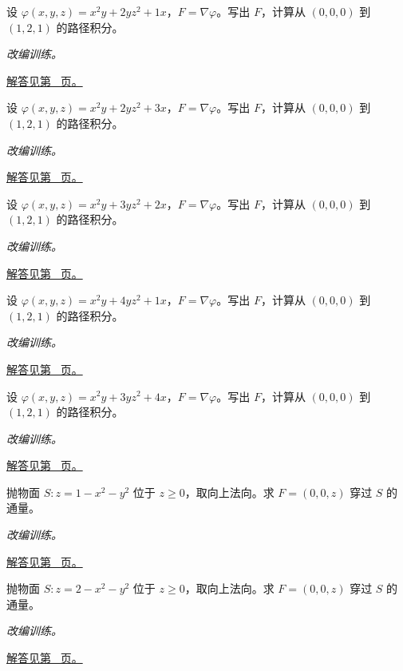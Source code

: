 \documentclass[12pt,fontset=fandol]{ctexart}
\begin{document}
\begin{example}[势函数给出的空间路径积分]\label{ex:c44q14}
设 $\varphi(x,y,z)=x^2y+2yz^2+1x$，$F=\nabla\varphi$。写出 $F$，计算从 $(0,0,0)$ 到 $(1,2,1)$ 的路径积分。
\par\textit{改编训练。}\par\hyperref[ans:c44q14]{解答见第~\pageref{ans:c44q14} 页。}
\end{example}
\begin{example}[势函数给出的空间路径积分]\label{ex:c44q15}
设 $\varphi(x,y,z)=x^2y+2yz^2+3x$，$F=\nabla\varphi$。写出 $F$，计算从 $(0,0,0)$ 到 $(1,2,1)$ 的路径积分。
\par\textit{改编训练。}\par\hyperref[ans:c44q15]{解答见第~\pageref{ans:c44q15} 页。}
\end{example}
\begin{example}[势函数给出的空间路径积分]\label{ex:c44q16}
设 $\varphi(x,y,z)=x^2y+3yz^2+2x$，$F=\nabla\varphi$。写出 $F$，计算从 $(0,0,0)$ 到 $(1,2,1)$ 的路径积分。
\par\textit{改编训练。}\par\hyperref[ans:c44q16]{解答见第~\pageref{ans:c44q16} 页。}
\end{example}
\begin{example}[势函数给出的空间路径积分]\label{ex:c44q17}
设 $\varphi(x,y,z)=x^2y+4yz^2+1x$，$F=\nabla\varphi$。写出 $F$，计算从 $(0,0,0)$ 到 $(1,2,1)$ 的路径积分。
\par\textit{改编训练。}\par\hyperref[ans:c44q17]{解答见第~\pageref{ans:c44q17} 页。}
\end{example}
\begin{example}[势函数给出的空间路径积分]\label{ex:c44q18}
设 $\varphi(x,y,z)=x^2y+3yz^2+4x$，$F=\nabla\varphi$。写出 $F$，计算从 $(0,0,0)$ 到 $(1,2,1)$ 的路径积分。
\par\textit{改编训练。}\par\hyperref[ans:c44q18]{解答见第~\pageref{ans:c44q18} 页。}
\end{example}
\begin{example}[封闭曲面与缺失底面]\label{ex:c44q19}
抛物面 $S:z=1-x^2-y^2$ 位于 $z\ge0$，取向上法向。求 $F=(0,0,z)$ 穿过 $S$ 的通量。
\par\textit{改编训练。}\par\hyperref[ans:c44q19]{解答见第~\pageref{ans:c44q19} 页。}
\end{example}
\begin{example}[封闭曲面与缺失底面]\label{ex:c44q20}
抛物面 $S:z=2-x^2-y^2$ 位于 $z\ge0$，取向上法向。求 $F=(0,0,z)$ 穿过 $S$ 的通量。
\par\textit{改编训练。}\par\hyperref[ans:c44q20]{解答见第~\pageref{ans:c44q20} 页。}
\end{example}
\end{document}
